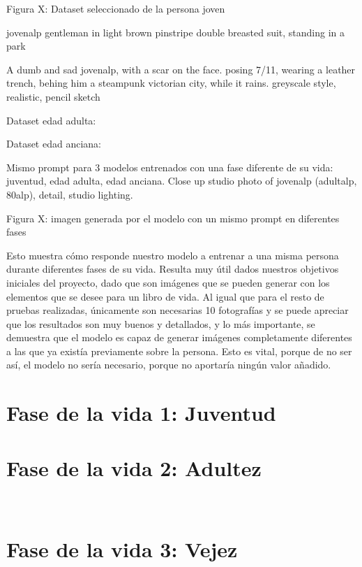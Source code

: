Figura X: Dataset seleccionado de la persona joven


jovenalp gentleman in light brown pinstripe double breasted suit, standing in a park

A dumb and sad jovenalp, with a scar on the face. posing 7/11, wearing a leather trench, behing him a steampunk victorian city, while it rains. greyscale style, realistic, pencil sketch

Dataset edad adulta:

Dataset edad anciana:


Mismo prompt para 3 modelos entrenados con una fase diferente de su vida: juventud, edad adulta, edad anciana.
Close up studio photo of jovenalp (adultalp, 80alp), detail, studio lighting.

Figura X: imagen generada por el modelo con un mismo prompt en diferentes fases

Esto muestra cómo responde nuestro modelo a entrenar a una misma persona durante diferentes fases de su vida. Resulta muy útil dados nuestros objetivos iniciales del proyecto, dado que son imágenes que se pueden generar con los elementos que se desee para un libro de vida. Al igual que para el resto de pruebas realizadas, únicamente son necesarias 10 fotografías y se puede apreciar que los resultados son muy buenos y detallados, y lo más importante, se demuestra que el modelo es capaz de generar imágenes completamente diferentes a las que ya existía previamente sobre la persona. Esto es vital, porque de no ser así, el modelo no sería necesario, porque no aportaría ningún valor añadido.


\section{Fase de la vida 1: Juventud}

\section{Fase de la vida 2: Adultez}\\

\section{Fase de la vida 3: Vejez}

